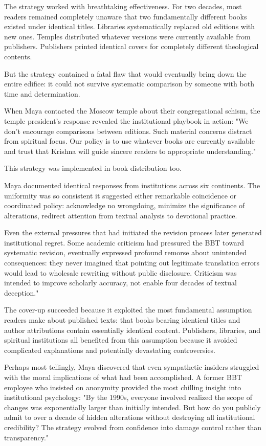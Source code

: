 \documentclass[12pt,twoside]{book}
\begin{document}
The strategy worked with breathtaking effectiveness. For two decades, most readers remained completely unaware that two fundamentally different books existed under identical titles. Libraries systematically replaced old editions with new ones. Temples distributed whatever versions were currently available from publishers. Publishers printed identical covers for completely different theological contents.

But the strategy contained a fatal flaw that would eventually bring down the entire edifice: it could not survive systematic comparison by someone with both time and determination.

When Maya contacted the Moscow temple about their congregational schism, the temple president's response revealed the institutional playbook in action: "We don't encourage comparisons between editions. Such material concerns distract from spiritual focus. Our policy is to use whatever books are currently available and trust that Krishna will guide sincere readers to appropriate understanding."

This strategy was implemented in book distribution too.

Maya documented identical responses from institutions across six continents. The uniformity was so consistent it suggested either remarkable coincidence or coordinated policy: acknowledge no wrongdoing, minimize the significance of alterations, redirect attention from textual analysis to devotional practice.

Even the external pressures that had initiated the revision process later generated institutional regret. Some academic criticism had pressured the BBT toward systematic revision, eventually expressed profound remorse about unintended consequences: they never imagined that pointing out legitimate translation errors would lead to wholesale rewriting without public disclosure. Criticism was intended to improve scholarly accuracy, not enable four decades of textual deception."

The cover-up succeeded because it exploited the most fundamental assumption readers make about published texts: that books bearing identical titles and author attributions contain essentially identical content. Publishers, libraries, and spiritual institutions all benefited from this assumption because it avoided complicated explanations and potentially devastating controversies.

Perhaps most tellingly, Maya discovered that even sympathetic insiders struggled with the moral implications of what had been accomplished. A former BBT employee who insisted on anonymity provided the most chilling insight into institutional psychology: "By the 1990s, everyone involved realized the scope of changes was exponentially larger than initially intended. But how do you publicly admit to over a decade of hidden alterations without destroying all institutional credibility? The strategy evolved from confidence into damage control rather than transparency."
\end{document}
